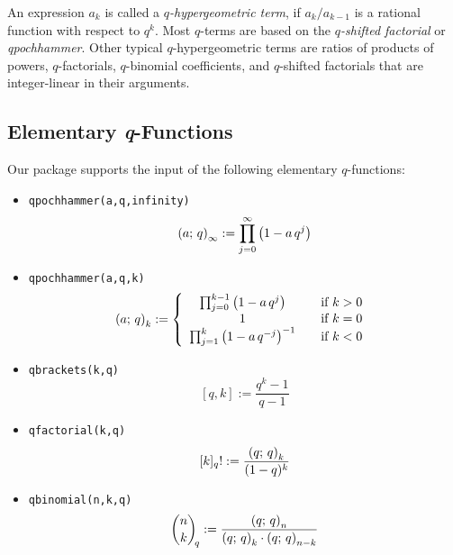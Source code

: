 An expression $a_k$ is called a \textsl{$q$-hypergeometric term}, if
$a_{k}/a_{k-1}$ is a rational function with respect to $q^k$. Most
$q$-terms are based on the \textsl{$q$-shifted factorial} or
\textsl{qpochhammer}. Other typical $q$-hypergeometric terms are ratios
of products of powers, $q$-factorials, $q$-binomial coefficients, and
$q$-shifted factorials that are integer-linear in their arguments.


\subsection{Elementary \textsl{q}-Functions}

Our package supports the input of the following elementary
$q$-functions:
\begin{itemize}
%
\item \texttt{qpochhammer(a,q,infinity)}\[
	\left(a;\,q\right)_{\infty}:= \prod_{j=0}^{\infty}{\left(1-a\,q^j\right)}
	\]
\item \texttt{qpochhammer(a,q,k)} \[
	\left(a;\,q\right)_{k}:=
         \left\{\begin{array}{ccc}
           \prod_{j=0}^{k-1}{\left(1-a\,q^j\right)} && \mbox{{if} $k>0$ } \\
           1 && \mbox{{if} $k=0$ } \\
           \prod_{j=1}^{k}{\left(1-a\,q^{-j}\right)^{-1}} && \mbox{{if} $k<0$ }
         \end{array}\right.
	\]
\item  \texttt{qbrackets(k,q)}
	\[  {}[q,k]:=\frac{q^k-1}{q-1}  \]
\item  \texttt{qfactorial(k,q)}
	\[   {}[k]_q!:= \frac{\left(q;\,q\right)_{k}}{(1-q)^k}  \]
\item  \texttt{qbinomial(n,k,q)}
	\[  {\binom{n}{k}\!}_q:=
		\frac{\left(q;\,q\right)_{n}}{\left(q;\,q\right)_{k}\cdot\left(q;\,q\right)_{n-k}} \]
\end{itemize}


